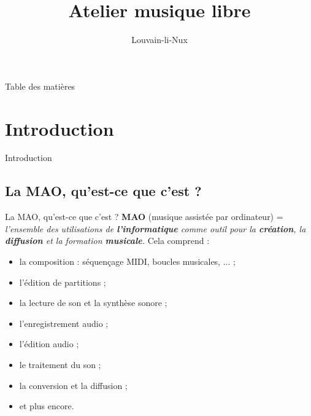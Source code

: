 \documentclass{beamer}
\title{Atelier musique libre}
\author{Louvain-li-Nux}
\begin{document}
\frame{\titlepage}

\begin{frame}{Table des matières}
  \tableofcontents
\end{frame}

\section{Introduction}
\begin{frame}{Introduction}
\end{frame}

\subsection{La MAO, qu'est-ce que c'est ?}
\begin{frame}{La MAO, qu'est-ce que c'est ?}
  \textbf{MAO} (musique assistée par ordinateur) = \textit{l'ensemble des utilisations de \textbf{l'informatique} comme outil pour la \textbf{création}, la \textbf{diffusion} et la formation \textbf{musicale}.}
  Cela comprend :
  \begin{itemize}
  \item la composition : séquençage MIDI, boucles musicales, ... ;
  \item l'édition de partitions ;
  \item la lecture de son et la synthèse sonore ;
  \item l'enregistrement audio ;
  \item l'édition audio ;
  \item le traitement du son ;
  \item la conversion et la diffusion ;
  \item et plus encore.
  \end{itemize}
\end{frame}

\end{document}
